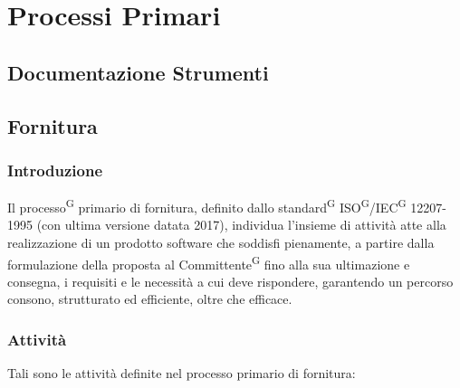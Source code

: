 \documentclass[8pt]{article}
\newcommand{\glossterm}[1]{#1\textsuperscript{G}} %
\begin{document}
\section{Processi Primari} \label{sec:processi_primari}
\subsection{Documentazione Strumenti}

\subsection{Fornitura}

\subsubsection{Introduzione}
Il \glossterm{processo} primario di fornitura, definito dallo \glossterm{standard}
\glossterm{ISO}/\glossterm{IEC} 12207-1995 (con ultima versione datata 2017), individua l'insieme di
attività atte alla realizzazione di un prodotto software che soddisfi pienamente, a partire dalla
formulazione della proposta al \glossterm{Committente} fino alla sua ultimazione e consegna, i requisiti e le necessità a cui deve rispondere, garantendo un percorso consono, strutturato ed efficiente, oltre che efficace.

\subsubsection{Attività}
Tali sono le attività definite nel processo primario di fornitura:
\end{document}
